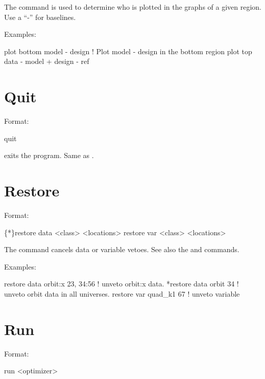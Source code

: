 \vskip 0.2in The  command is used to determine who is plotted
in the graphs of a given region. Use a ``-'' for baselines. 

Examples:
\begin{example}
  plot bottom model - design       ! Plot model - design in the bottom region
  plot top data - model + design - ref 
\end{example}

\section{Quit}
\label{s:quit}

Format:
\begin{example}
  quit
\end{example}

\vskip 0.2in
 exits the program. Same as .

\section{Restore}
\label{s:restore}

Format:
\begin{example}
  \{*\}restore data  <class> <locations>
  restore var <class> <locations>
\end{example}

\vskip 0.2in The  command cancels data or variable
vetoes. See also the 
and  commands.

Examples:
\begin{example}
  restore data orbit:x  23, 34:56 ! unveto orbit:x data.
  *restore data orbit 34          ! unveto orbit data in all universes.
  restore var quad_k1 67     ! unveto variable
\end{example}


\section{Run}
\label{s:run}

Format:
\begin{example}
  run <optimizer>
\end{example}

\vskip 0.2in

